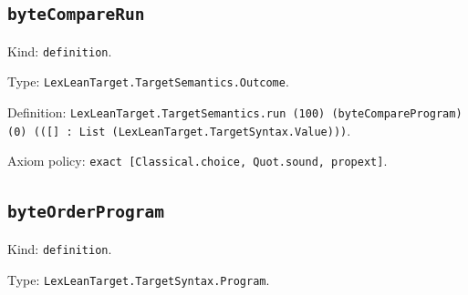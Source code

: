 \documentclass[11pt]{article}
\begin{document}
\subsection*{\texttt{byteCompareRun}}
\noindent Kind: \texttt{definition}.\par
\noindent Type: \texttt{LexLeanTarget.TargetSemantics.Outcome}.\par
\noindent Definition: \texttt{LexLeanTarget.TargetSemantics.run (100) (byteCompareProgram) (0) (([] : List (LexLeanTarget.TargetSyntax.Value)))}.\par
\noindent Axiom policy: \texttt{exact [Classical.choice, Quot.sound, propext]}.\par
\subsection*{\texttt{byteOrderProgram}}
\noindent Kind: \texttt{definition}.\par
\noindent Type: \texttt{LexLeanTarget.TargetSyntax.Program}.\par
\end{document}
